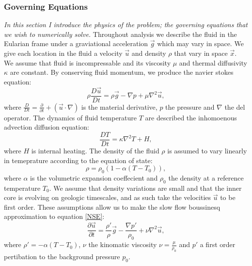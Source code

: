 \documentclass{article}
\begin{document}
\subsubsection*{Governing Equations}
{\it{In this section I introduce the physics of the problem; the governing equations that we wish to numerically solve.}}
\vspace{0.3cm}
\newline
\noindent Throughout analysis we describe the fluid in the Eularian frame under a graviational acceleration $\vec{g}$ which may vary in space. We give each location in the fluid a velocity $\vec{u}$ and density $\rho$ that vary in space $\vec{x}$. We assume that fluid is incompressable and its viscosity $\mu$ and thermal diffusivity $\kappa$ are constant. By conserving fluid momentum, we produce the navier stokes equation:
\begin{equation}
	\rho \frac{D \vec{u}}{D t} = \rho \vec{g} - \nabla p + \mu \nabla^2 \vec{u},
	\label{NSE}
\end{equation}
where $\frac{D}{D t} = \frac{\partial }{\partial t} + (\vec{u} \cdot \nabla)$ is the material derivative, $p$ the pressure and $\nabla$ the del operator. The dynamics of fluid temperature $T$ are described the inhomoenous advection diffusion equation:
\begin{equation}
	\frac{D T}{D t} = \kappa \nabla^2 T + H,
	\label{adeT}
\end{equation}
where $H$ is internal heating. The density of the fluid $\rho$ is assumed to vary linearly in temeprature according to the equation of state:
\begin{equation}
	\rho = \rho_0 (1- \alpha(T - T_0)),
	\label{equation of state}
\end{equation}
where $\alpha$ is the volumetric expansion coeffecient and $\rho_0$ the density at a reference temperature $T_0$. We assume that density variations are small and that the inner core is evolving on geologic timescales, and as such take the velocities $\vec{u}$ to be first order. These assumptions allow us to make the slow flow boussinesq approximation to equation \ref{NSE}:
\begin{equation}
	\frac{\partial \vec{u}}{\partial t} = \frac{\rho'}{\rho} \vec{g} -   \frac{\nabla p'}{\rho_0} + \nu \nabla^2 \vec{u},
	\label{NSE slow + boussinesq}
\end{equation}
where $\rho'=-\alpha(T - T_0)$, $\nu$ the kinomatic viscosity $\nu = \frac{\mu}{\rho_0}$ and $p'$ a first order pertibation to the background pressure $p_0$. 
\newline
\end{document}
